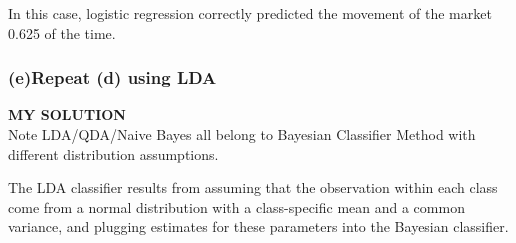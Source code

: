 \documentclass[
]{article}
\newenvironment{Shaded}{\begin{snugshade}}{\end{snugshade}}
\newcommand{\AttributeTok}[1]{\textcolor[rgb]{0.77,0.63,0.00}{#1}}
\newcommand{\CommentTok}[1]{\textcolor[rgb]{0.56,0.35,0.01}{\textit{#1}}}
\newcommand{\DecValTok}[1]{\textcolor[rgb]{0.00,0.00,0.81}{#1}}
\newcommand{\ErrorTok}[1]{\textcolor[rgb]{0.64,0.00,0.00}{\textbf{#1}}}
\newcommand{\FloatTok}[1]{\textcolor[rgb]{0.00,0.00,0.81}{#1}}
\newcommand{\FunctionTok}[1]{\textcolor[rgb]{0.00,0.00,0.00}{#1}}
\newcommand{\NormalTok}[1]{#1}
\newcommand{\OtherTok}[1]{\textcolor[rgb]{0.56,0.35,0.01}{#1}}
\newcommand{\SpecialCharTok}[1]{\textcolor[rgb]{0.00,0.00,0.00}{#1}}
\begin{document}
In this case, logistic regression correctly predicted the movement of
the market 0.625 of the time.

\hypertarget{erepeat-d-using-lda}{%
\subsubsection{\texorpdfstring{\textbf{(e)Repeat (d) using
LDA}}{(e)Repeat (d) using LDA}}\label{erepeat-d-using-lda}}

\textbf{MY SOLUTION}\\
Note LDA/QDA/Naive Bayes all belong to Bayesian Classifier Method with
different distribution assumptions.

The LDA classifier results from assuming that the observation within
each class come from a normal distribution with a class-specific mean
and a common variance, and plugging estimates for these parameters into
the Bayesian classifier.

\begin{Shaded}
\end{Shaded}
\end{document}
